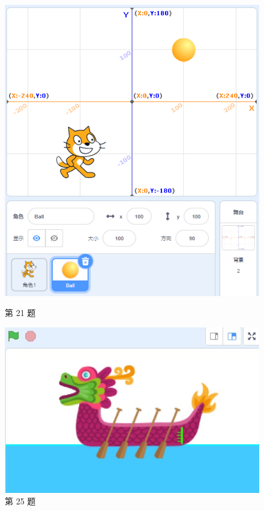 \documentclass[10pt, a4paper]{article}
\begin{document}
\begin{enumerate}
        \begin{figure}[htbp]
            \centering
            \begin{minipage}[t]{.2\textwidth}
                \centering
                \includegraphics[width=\textwidth]{21.png}
                \caption*{第 21 题}
            \end{minipage}
            \begin{minipage}[t]{.35\textwidth}
                \centering
                \includegraphics[width=\textwidth]{25.jpg}
                \caption*{第 25 题}
            \end{minipage}
        \end{figure}


\end{enumerate}
\end{document}
